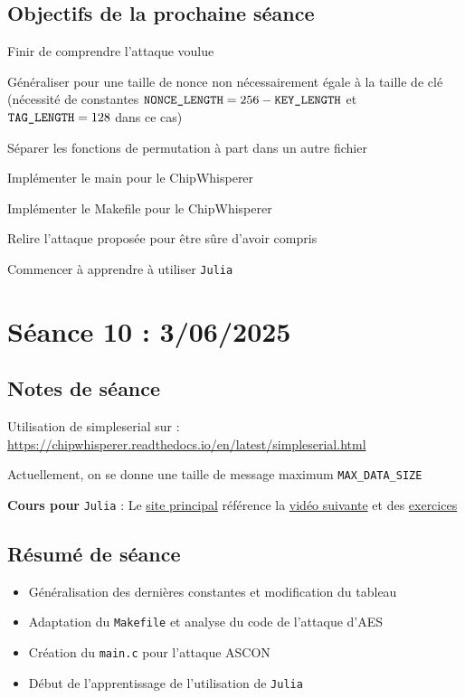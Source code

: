 \documentclass[12pt]{article}
\newcommand{\cmark}{\ding{51}}%
\newcommand{\done}{\rlap{$\square$}{\raisebox{2pt}{\large\hspace{1pt}\cmark}}%
	\hspace{-2.5pt}}
\begin{document}
	\subsection{Objectifs de la prochaine séance}
	\begin{todolist}
		\item[\done] Finir de comprendre l'attaque voulue
		\item[\done] Généraliser pour une taille de nonce non nécessairement égale à la taille de clé (nécessité de constantes $\verb|NONCE_LENGTH|=256-\verb|KEY_LENGTH|$ et $\verb|TAG_LENGTH|=128$ dans ce cas)
		\item[\done] Séparer les fonctions de permutation à part dans un autre fichier
		\item[\done] Implémenter le main pour le ChipWhisperer
		\item[\done] Implémenter le Makefile pour le ChipWhisperer
		\item[\done] Relire l'attaque proposée pour être sûre d'avoir compris
		\item[\done] Commencer à apprendre à utiliser \verb|Julia|
	\end{todolist}
	
	
	\section{Séance 10 : 3/06/2025}
	\subsection{Notes de séance}
	Utilisation de simpleserial sur : \url{https://chipwhisperer.readthedocs.io/en/latest/simpleserial.html}
	
	\noindent Actuellement, on se donne une taille de message maximum \verb|MAX_DATA_SIZE|
	
	\noindent \textbf{Cours pour} \verb|Julia| : Le \href{https://julialang.org/learning/}{site principal} référence la \href{https://www.youtube.com/watch?v=X4Alzh3QyWU}{vidéo suivante} et des \href{https://exercism.org/tracks/julia/exercises}{exercices}
	
	\subsection{Résumé de séance}
	\begin{itemize}
		\item Généralisation des dernières constantes et modification du tableau
		\item Adaptation du \verb|Makefile| et analyse du code de l'attaque d'AES
		\item Création du \verb|main.c| pour l'attaque ASCON
		\item Début de l'apprentissage de l'utilisation de \verb|Julia|
	\end{itemize}
	
\end{document}

